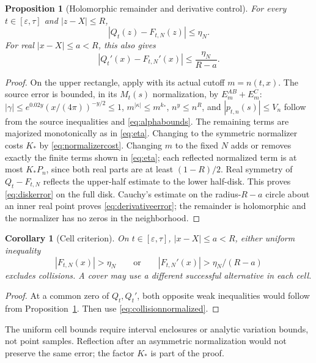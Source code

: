 \documentclass[11pt]{article}
\numberwithin{equation}{section}
\newtheorem{proposition}[theorem]{Proposition}
\newtheorem{corollary}[theorem]{Corollary}
\theoremstyle{definition}
\theoremstyle{remark}
\begin{document}
\begin{proposition}[Holomorphic remainder and derivative control]
\label{prop:diskerror}
For every $t\in[\varepsilon,\tau]$ and $|z-X|\le R$,
\begin{equation}\label{eq:diskerror}
 |Q_t(z)-F_{t,N}(z)|\le\eta_N.
\end{equation}
For real $|x-X|\le a<R$, this also gives
\begin{equation}\label{eq:derivativeerror}
 |Q_t'(x)-F_{t,N}'(x)|\le\frac{\eta_N}{R-a}.
\end{equation}
\end{proposition}
\begin{proof}
On the upper rectangle, apply \cite[Theorem~1.3, equations~(23)--(24)]{polymath}
with its actual cutoff $m=n(t,x)$. The source error is bounded, in
its $M_t(s)$ normalization, by $E_m^{AB}+E_m^C$:
$|\gamma|\le e^{0.02y}(x/(4\pi))^{-y/2}\le1$,
$m^{|\kappa|}\le m^{k_*}$, $n^y\le n^R$, and
$|p_{t,n}(s)|\le V_n$ follow from the source inequalities and
\eqref{eq:alphabounds}. The remaining terms are majorized
monotonically as in \eqref{eq:eta}. Changing to the symmetric
normalizer costs $K_*$ by \eqref{eq:normalizercost}. Changing $m$ to
the fixed $N$ adds or removes exactly the finite terms shown in
\eqref{eq:eta}; each reflected normalized term is at most $K_*P_n$,
since both real parts are at least $(1-R)/2$. Real symmetry of
$Q_t-F_{t,N}$ reflects the upper-half estimate to the lower half-disk.
This proves \eqref{eq:diskerror} on the full disk. Cauchy's estimate
on the radius-$R-a$ circle about an inner real point proves
\eqref{eq:derivativeerror}; the remainder is holomorphic and the
normalizer has no zeros in the neighborhood.
\end{proof}

\begin{corollary}[Cell criterion]\label{cor:cell}
On $t\in[\varepsilon,\tau]$, $|x-X|\le a<R$, either uniform inequality
\[
 |F_{t,N}(x)|>\eta_N\qquad\text{or}\qquad
 |F_{t,N}'(x)|>\eta_N/(R-a)
\]
excludes collisions. A cover may use a different successful alternative
in each cell.
\end{corollary}
\begin{proof}
At a common zero of $Q_t,Q_t'$, both opposite weak inequalities
would follow from Proposition~\ref{prop:diskerror}. Then use
\eqref{eq:collisionnormalized}.
\end{proof}
The uniform cell bounds require interval enclosures or analytic
variation bounds, not point samples. Reflection after an asymmetric
normalization would not preserve the same error; the factor $K_*$
is part of the proof.
\end{document}

